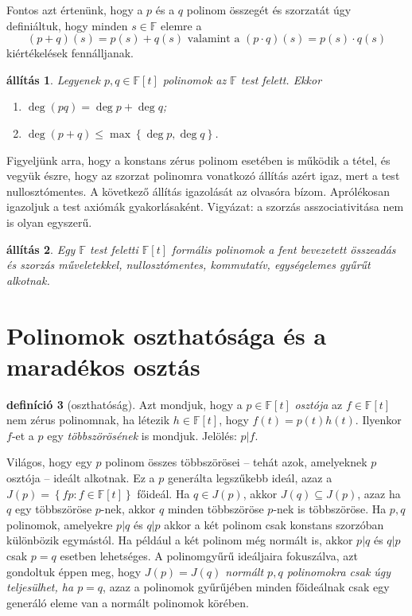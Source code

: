 \documentclass[a4paper, showtrims]{memoir}
\makeatletter
\renewenvironment{proof}[1][\proofname]
    {\par\pushQED{\qed}%
    \normalfont \topsep6\p@\@plus6\p@\relax
    \trivlist
    \item[\hskip\labelsep
        \itshape
    #1\@addpunct{:}]\ignorespaces}
    {\popQED\endtrivlist\@endpefalse}
\theoremstyle{plain}
\newtheorem{proposition}{állítás}[chapter]
\theoremstyle{remark}
\theoremstyle{definition}
\newtheorem{definition}[proposition]{definíció}
\makeatother
\begin{document}
Fontos azt értenünk, hogy a $p$ és a $q$ polinom összegét és szorzatát úgy definiáltuk, hogy minden $s\in\mathbb{F}$ elemre a
\[
    \left( p+q \right)\left( s \right)
    =
    p\left( s \right)+q\left( s \right)
    \text{ valamint a }
    \left( p\cdot q \right)\left( s \right)
    =
    p\left( s \right)\cdot q\left( s \right)
\]
kiértékelések fennálljanak.
\begin{proposition}
	Legyenek $p,q\in\mathbb{F}[t]$ polinomok az $\mathbb{F}$ test felett.
	Ekkor
	\begin{enumerate}
		\item $\deg \left( pq \right)=\deg p+\deg q$;
		\item $\deg \left( p+q \right)\leq\max\left\{ \deg p,\deg q \right\}$.\qedhere
	\end{enumerate}
\end{proposition}
\begin{proof}
	Figyeljünk arra, hogy a konstans zérus polinom esetében is működik a tétel,
	és vegyük észre, hogy az szorzat polinomra vonatkozó állítás azért igaz,
	mert a test nullosztómentes.
\end{proof}
A következő állítás igazolását az olvasóra bízom.
Aprólékosan igazoljuk a test axiómák gyakorlásaként.
Vigyázat: a szorzás asszociativitása nem is olyan egyszerű.
\begin{proposition}
	Egy $\mathbb{F}$ test feletti $\mathbb{F}\left[ t \right]$ formális polinomok
	a fent bevezetett összeadás és szorzás műveletekkel,
	nullosztómentes,
	kommutatív, egységelemes gyűrűt alkotnak.
\end{proposition}

\section{Polinomok oszthatósága és a maradékos osztás}
\begin{definition}[oszthatóság]
	Azt mondjuk, hogy a $p\in\mathbb{F}\left[ t \right]$ \emph{osztója} az $f\in\mathbb{F}\left[ t \right]$ nem zérus polinomnak,
	ha létezik $h\in\mathbb{F}\left[ t \right]$, hogy $f\left( t \right)=p\left( t \right)h\left( t \right)$.
	Ilyenkor $f$-et a $p$ egy \emph{többszörösének} is mondjuk.
	Jelölés: $p|f$.
\end{definition}
Világos, hogy egy $p$ polinom összes többszörösei -- tehát azok, amelyeknek $p$ osztója --
ideált alkotnak.
Ez a $p$ generálta legszűkebb ideál, azaz  a $J(p)=\left\{ fp:f\in\mathbb{F}\left[ t \right] \right\}$ főideál.
Ha $q\in J\left( p \right)$, akkor $J\left( q \right)\subseteq J\left( p \right)$, azaz ha $q$ egy többszöröse $p$-nek,
akkor $q$ minden többszöröse $p$-nek is többszöröse.
Ha $p,q$ polinomok,
amelyekre $p|q$ és $q|p$ akkor a két polinom csak konstans szorzóban különbözik egymástól.
Ha például a két polinom még normált is, akkor $p|q$ és $q|p$ csak $p=q$ esetben lehetséges.
A polinomgyűrű ideáljaira fokuszálva, azt gondoltuk éppen meg,
hogy \emph{$J\left( p \right)=J\left( q \right)$ normált $p,q$ polinomokra csak úgy teljesülhet, ha $p=q$},
azaz a polinomok gyűrűjében minden főideálnak csak egy generáló eleme van a normált polinomok körében.
\end{document}
